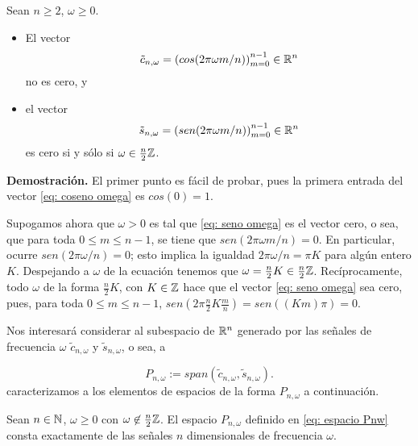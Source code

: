 \begin{prop}
\label{prop: para que frecuencias omega vector seno es cero}
	Sean $n \geq 2$, $\omega \geq 0$.
	\begin{itemize}
		\item El vector 
		\begin{equation}
		\label{eq: coseno omega}
		\tilde{c}_{n, \omega} = \left(cos(2 \pi \omega m/n) \right)_{m=0}^{n-1} \in \mathbb{R}^{n}
		\end{equation}
		no es cero, y 
		\item el vector 
		\begin{equation}
		\label{eq: seno omega}
		\tilde{s}_{n, \omega} = \left(sen(2 \pi \omega m/n) \right)_{m=0}^{n-1} \in \mathbb{R}^{n}
		\end{equation}
		es cero si y sólo si $\omega \in \frac{n}{2} \mathbb{Z}$.
	\end{itemize}
\end{prop}
\noindent
\textbf{Demostración.}
El primer punto es fácil de probar, pues la primera entrada del
vector \eqref{eq: coseno omega} es 
$cos(0)=1$.

Supogamos ahora que $\omega>0$ es tal que \eqref{eq: seno omega}
es el vector cero, o sea, que
para toda $0 \leq m \leq n-1$, se tiene que 
$sen(2 \pi \omega m/n)=0$. En particular, ocurre
$sen(2 \pi \omega /n)=0$; esto implica la igualdad 
$2 \pi \omega /n = \pi K$ para algún entero $K$. Despejando
a $\omega$ de la ecuación tenemos que 
$\omega = \frac{n}{2}K \in \frac{n}{2} \mathbb{Z}$. Recíprocamente,
todo $\omega$ de la forma 
$\frac{n}{2}K$, con $K \in \mathbb{Z}$ hace que el vector 
\eqref{eq: seno omega} sea cero, pues, para toda $0 \leq m \leq n-1$,
$sen\left(2 \pi \frac{n}{2}K \frac{m}{n}\right)=
sen((Km)\pi)=0$.
\QEDB
\vspace{0.2cm}

Nos interesará considerar al subespacio
de $\mathbb{R}^{n}$ generado por las señales
de frecuencia $\omega$ $\tilde{c}_{n, \omega}$
y $\tilde{s}_{n, \omega}$, o sea, a 

\begin{equation}
\label{eq: espacio Pnw}
P_{n, \omega} := span(\tilde{c}_{n, \omega}, \tilde{s}_{n, \omega}).
\end{equation} 
caracterizamos a los elementos de 
espacios de la forma
$P_{n, \omega}$ a continuación.

\begin{teo}
\label{prop: Pw consta de las señales de frecuencia omega}
Sean $n \in \mathbb{N}$, $\omega \geq 0$ 
con 
$\omega \not\in \frac{n}{2} \mathbb{Z}$.
El espacio $P_{n, \omega}$ definido en \eqref{eq: espacio Pnw} consta exactamente
de las señales $n$ dimensionales de frecuencia $\omega$.
\end{teo}

